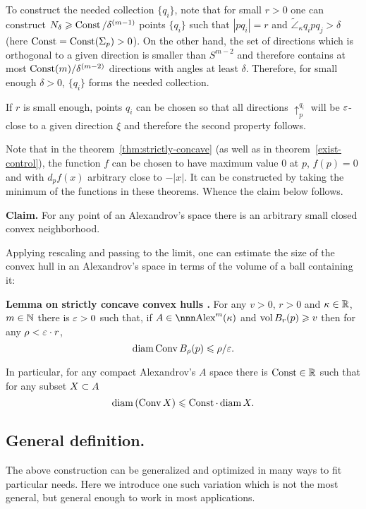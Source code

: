 \documentclass{article}
\begin{document}
To construct the needed collection $\{q_i\}$, note that for small $r>0$ one can
construct $N_\delta\geqslant \operatorname{Const}/\delta^{(m-1)}$ points $\{q_i\}$ such that $|p q_i|=r$
and $\tilde\angle_\kappa q_i p q_j>\delta$ (here $\operatorname{Const}=\operatorname{Const}(\Sigma_p)>0$).
On the other hand, the set of directions which is orthogonal to a given direction
is smaller than $S^{m-2}$ and therefore contains at most
$\operatorname{Const}(m)/\delta^{(m-2)}$ directions with angles at least $\delta$. 
Therefore, for small enough $\delta>0$, $\{q_i\}$ forms the needed collection.

If $r$ is small enough, points $q_i$ can be chosen so that all directions
$\uparrow_p^{q_i}$ will be $\varepsilon$-close to a given direction $\xi$ and
therefore the second property follows.
\qeds

Note that in the theorem~\ref{thm:strictly-concave} (as well as in
theorem~\ref{exist-control}), the function $f$ can be chosen to have maximum value $0$ at $p$,
$f(p)=0$ and with $d_p f(x)$ arbitrary close to $-|x|$.
It can be constructed by taking the minimum of the functions in these theorems. Whence the claim below follows.


\begin{thm}{\bf Claim.}\label{cor:convex-nbhd}
For any point of an Alexandrov's space there is an arbitrary small closed convex
neighborhood.
\end{thm}

Applying rescaling and passing to the limit, 
one can estimate the size of the convex
hull in an Alexandrov's space in terms of the volume of a ball containing it:

\begin{thm}{\bf Lemma on strictly concave convex hulls
\cite[4.3]{perelman-petrunin:extremal}.}
For any $v>0$, $r>0$ and $\kappa\in \mathbb{R}$, $m\in\mathbb{N}$ there is $\varepsilon>0$ such that,
if $A\in\Alex^m(\kappa)$ and $\operatorname{vol} B_{r}(p)\geqslant v$ then for any $\rho<\varepsilon\cdot r$, 
$$\operatorname{diam}\operatorname{Conv} B_\rho(p)\leqslant \rho/\varepsilon.$$

In particular, for any compact Alexandrov's $A$ space there is $\operatorname{Const}\in \mathbb{R}$ such that for
any subset $X\subset A$
$$\operatorname{diam} \left(\operatorname{Conv} X \right)\leqslant \operatorname{Const}\cdot\operatorname{diam} X.$$
\end{thm}





\subsection{General definition.} 
The above construction can be generalized and optimized in many ways to fit
particular needs. 
Here we introduce one such variation which is not the most general, but general
enough to work in most applications.
\end{document}
